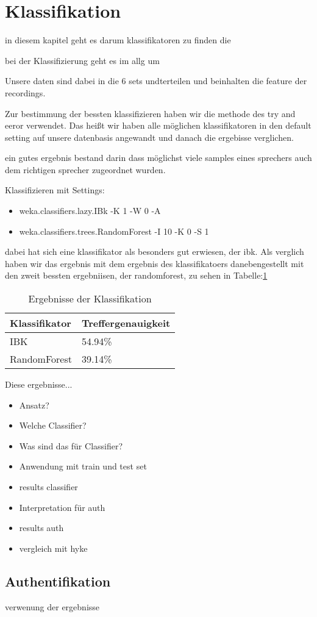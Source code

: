 \section{Klassifikation}

in diesem kapitel geht es darum klassifikatoren zu finden die 

bei der Klassifizierung geht es im allg um


Unsere daten sind dabei in die 6 sets undterteilen und beinhalten die feature der recordings.



Zur bestimmung der bessten klassifizieren haben wir die methode des try and eeror verwendet. Das heißt wir haben alle möglichen klassifikatoren in den default setting auf unsere datenbasis angewandt und danach die ergebisse verglichen.

ein gutes ergebnis bestand darin dass möglichst viele samples eines sprechers auch dem richtigen sprecher zugeordnet wurden.



Klassifizieren mit Settings:
\begin{itemize}
	\item weka.classifiers.lazy.IBk -K 1 -W 0 -A 
	\item weka.classifiers.trees.RandomForest -I 10 -K 0 -S 1
\end{itemize}

dabei hat sich eine klassifikator als besonders gut erwiesen, der ibk. Als verglich haben wir das ergebnis mit dem ergebnis des klassifikatoers danebengestellt mit den zweit bessten ergebniisen, der randomforest, zu sehen in Tabelle:\ref{tab:resultsClassifiers}

\begin{table}[h]
	\centering
    \begin{tabular}{ | l | l |}
    \hline
    Klassifikator & Treffergenauigkeit  \\ \hline 
    IBK & 54.94\% \\ \hline
    RandomForest & 39.14\% \\ \hline
    \end{tabular}
    \caption{Ergebnisse der Klassifikation}
   \label{tab:resultsClassifiers}
\end{table}

Diese ergebnisse...


\begin{itemize}
	\item Ansatz?
    \item Welche Classifier?
    \item Was sind das für Classifier?
    \item Anwendung mit train und test set
    \item results classifier
    \item Interpretation für auth
    \item results auth
    \item vergleich mit hyke
\end{itemize}



\subsection{Authentifikation}


verwenung der ergebnisse

